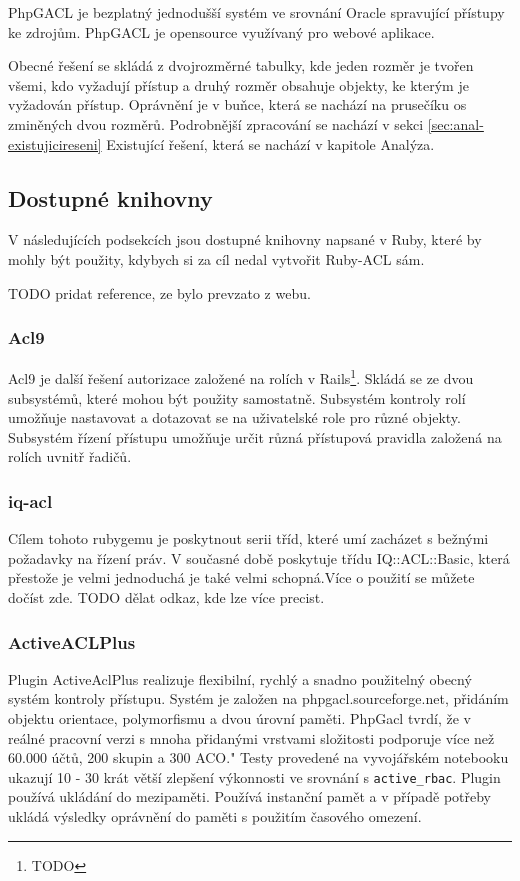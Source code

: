 PhpGACL je bezplatný jednodušší systém ve srovnání Oracle spravující přístupy ke zdrojům. PhpGACL je opensource využívaný pro webové aplikace.

Obecné řešení se skládá z dvojrozměrné tabulky, kde jeden rozměr je tvořen všemi, kdo vyžadují přístup a druhý rozměr obsahuje objekty, ke kterým je vyžadován přístup. Oprávnění je v buňce, která se nachází na prusečíku os zminěných dvou rozměrů.
Podrobnější zpracování se nachází v sekci \ref{sec:anal-existujicireseni} Existující řešení, která se nachází v kapitole Analýza.

\subsection{Dostupné knihovny}
V následujících podsekcích jsou dostupné knihovny napsané v Ruby, které by mohly být použity, kdybych si za cíl nedal vytvořit Ruby-ACL sám.

TODO pridat reference, ze bylo prevzato z webu.

\subsubsection{Acl9}
Acl9 je další řešení autorizace založené na rolích v Rails\footnote[2]{TODO}. Skládá se ze dvou subsystémů, které mohou být použity samostatně. Subsystém kontroly rolí umožňuje nastavovat a dotazovat se na uživatelské role pro různé objekty. 
Subsystém řízení přístupu umožňuje určit různá přístupová pravidla založená na rolích uvnitř řadičů.

\subsubsection{iq-acl}
Cílem tohoto rubygemu je poskytnout serii tříd, které umí zacházet s bežnými požadavky na řízení práv. V současné době poskytuje třídu IQ::ACL::Basic, která přestože je velmi jednoduchá je také velmi schopná.Více o použití se můžete dočíst zde. TODO dělat odkaz, kde lze více precist.

\subsubsection{ActiveACLPlus}
Plugin ActiveAclPlus realizuje flexibilní, rychlý a snadno použitelný obecný systém kontroly přístupu.
Systém je založen na phpgacl.sourceforge.net, přidáním objektu orientace, polymorfismu a dvou úrovní paměti. PhpGacl tvrdí, že v reálné pracovní verzi s mnoha přidanými vrstvami složitosti podporuje více než 60.000 účtů, 200 skupin a 300 ACO." Testy provedené na vyvojářském notebooku ukazují 10 - 30 krát větší zlepšení výkonnosti ve srovnání s \verb|active_rbac|.
Plugin používá ukládání do mezipaměti. Používá instanční pamět a v případě potřeby ukládá výsledky oprávnění do paměti s použitím časového omezení.